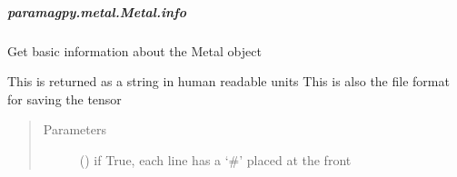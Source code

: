 \documentclass[a4paper,10pt,english,openany,oneside]{sphinxmanual}
\begin{document}
\begin{fulllineitems}
\begin{fulllineitems}
\begin{fulllineitems}
%
\begin{sphinxVerbatim}[commandchars=\\\{\}]
  \PYG{p}{[} \PYG{p}{]}\PYG{p}{[}\PYG{p}{]}
\PYG{p}{[}\PYG{p}{]}
\end{sphinxVerbatim}

\end{fulllineitems}



\subparagraph{paramagpy.metal.Metal.info}
\label{\detokenize{reference/generated/paramagpy.metal.Metal.info:paramagpy-metal-metal-info}}\label{\detokenize{reference/generated/paramagpy.metal.Metal.info::doc}}

\begin{fulllineitems}
\label{\detokenize{reference/generated/paramagpy.metal.Metal.info:paramagpy.metal.Metal.info}}
Get basic information about the Metal object

This is returned as a string in human readable units
This is also the file format for saving the tensor
\begin{quote}\begin{description}
\item[{Parameters}] \leavevmode
{} (\sphinxstyleliteralemphasis{\sphinxupquote{ (}}\sphinxstyleliteralemphasis{\sphinxupquote{)}}) \textendash{} if True, each line has a ‘\#’ placed at the front


\end{description}
\end{quote}
\end{fulllineitems}
\end{fulllineitems}
\end{fulllineitems}
\end{document}
